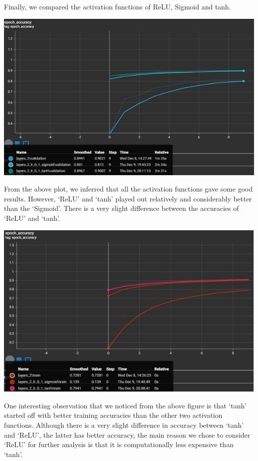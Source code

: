 \documentclass[12pt]{article}
\begin{document}
Finally, we compared the activation functions of ReLU, Sigmoid and tanh.

\includegraphics[scale=.75]{cnngraph3.PNG}

From the above plot, we inferred that all the activation functions gave some good results. However, ‘ReLU’ and ‘tanh’ played out relatively and considerably better than the ‘Sigmoid’. There is a very slight difference between the accuracies of ‘ReLU’ and ‘tanh’. 

\bigskip

\includegraphics[scale=.77]{cnngraph4.PNG}

\newpage

One interesting observation that we noticed from the above figure is that ‘tanh’ started off with better training accuracies than the other two activation functions. Although there is a very slight difference in accuracy between ‘tanh’ and ‘ReLU', the latter has better accuracy, the main reason we chose to consider ‘ReLU’ for further analysis is that it is computationally less expensive than ‘tanh’.
\end{document}
